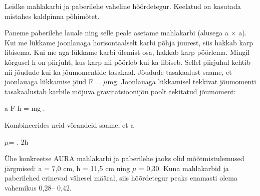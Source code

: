 
Leidke mahlakarbi ja paberilehe vaheline hõõrdetegur. Keelatud on kasutada mistahes kaldpinna põhimõtet.

\hint

\solu
Paneme paberilehe lauale ning selle peale asetame mahlakarbi (alusega a $\times$ a). Kui me lükkame joonlauaga horisontaalselt karbi põhja juurest, siis hakkab karp libisema. Kui me aga lükkame karbi ülemist osa, hakkab karp pöörlema. Mingil kõrgusel h on piirjuht, kus karp nii pöörleb kui ka libiseb. Sellel piirjuhul kehtib nii jõudude kui ka jõumomentide tasakaal. Jõudude tasakaalust saame, et joonlauaga lükkamise jõud F = $\mu$mg. Joonlauaga lükkamisel tekkivat jõumomenti tasakaalustab karbile mõjuva gravitatsioonijõu poolt tekitatud jõumoment:

a F h = mg .

Kombineerides neid võrandeid saame, et a

$\mu$= . 2h

Ühe konkreetse AURA mahlakarbi ja paberilehe jaoks olid mõõtmistulemused järgmised: a = 7,0 cm, h = 11,5 cm ning $\mu$ = 0,30. Kuna mahlakarbid ja paberilehed erinevad vähesel määral, siis hõõrdetegur peaks enamasti olema vahemikus 0,28-- 0,42.
\probend
